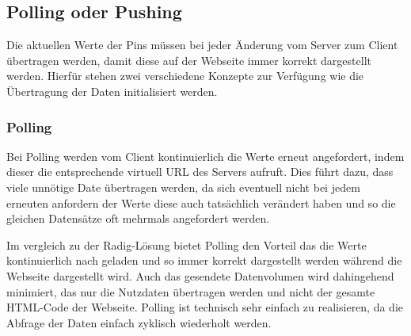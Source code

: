 
\subsection{Polling oder Pushing}
Die aktuellen Werte der Pins müssen bei jeder Änderung vom Server zum Client übertragen
werden, damit diese auf der Webseite immer korrekt dargestellt werden. Hierfür stehen zwei
verschiedene Konzepte zur Verfügung wie die Übertragung der Daten initialisiert werden.

\subsubsection{Polling}
Bei Polling werden vom Client kontinuierlich die Werte erneut angefordert, indem dieser
die entsprechende virtuell URL des Servers aufruft. Dies führt dazu, dass viele unnötige
Date übertragen werden, da sich eventuell nicht bei jedem erneuten anfordern der Werte
diese auch tatsächlich verändert haben und so die gleichen Datensätze oft mehrmals
angefordert werden.

Im vergleich zu der Radig-Lösung bietet Polling den Vorteil das die Werte kontinuierlich
nach geladen und so immer korrekt dargestellt werden während die Webseite dargestellt
wird. Auch das gesendete Datenvolumen wird dahingehend minimiert, das nur die Nutzdaten
übertragen werden und nicht der gesamte HTML-Code der Webseite. Polling ist technisch sehr
einfach zu realisieren, da die Abfrage der Daten einfach zyklisch wiederholt werden.

